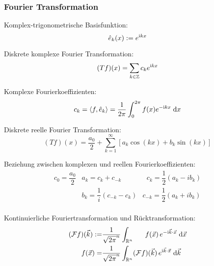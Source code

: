 \documentclass[11pt]{article}
\numberwithin{equation}{section}
\begin{document}
			\subsubsection{Fourier Transformation}
				\noindent
				Komplex-trigonometrische Basisfunktion:
				\begin{equation}
					\hat{e}_k(x):=e^{\mathrm{i} kx}
				\end{equation}

				\noindent
				Diskrete komplexe Fourier Transformation:
				\begin{equation}
					(Tf)(x)=\sum_{k\in\mathbb{Z}}c_k e^{\mathrm{i} kx}
				\end{equation}

				\noindent
				Komplexe Fourierkoeffizienten:
				\begin{equation}
					c_k = \left<f,\hat{e}_k\right>=\frac{1}{2\pi}\int_0^{2\pi}f(x)e^{-\mathrm{i} kx}\;\mathrm{d} x
				\end{equation}

				\noindent
				Diskrete reelle Fourier Transformation:
				\begin{equation}
					(Tf)(x)=\frac{a_0}{2}+\sum_{k=1}^{\infty}\left[a_k \cos(kx) + b_k \sin(kx) \right]
				\end{equation}

				\noindent
				Beziehung zwischen komplexen und reellen Fourierkoeffizienten:
				\begin{equation}
					\begin{array}{clc}
						c_0 = \dfrac{a_0}{2} & a_k = c_k+c_{-k} & \phantom{_{-}}c_k = \dfrac{1}{2}\left(a_k-ib_k\right) \\ [6pt]
						& b_k = \dfrac{1}{i}\left(c_{-k}-c_{k}\right) & c_{-k} = \dfrac{1}{2}\left(a_k+ib_k\right) \\
					\end{array}
				\end{equation}

				\noindent
				Kontinuierliche Fouriertransformation und Rücktransformation:
				\begin{equation}
					\begin{aligned}
						(\mathcal{F}f)(\vec{k}) :=& \frac{1}{\sqrt{2\pi}^n}\int_{\mathbb{R}^n} \phantom{(\mathcal{F})}f(\vec{x})\, e^{-\i\vec{k}\cdot\vec{x}}\;\diff\vec{x} \\
						\phantom{(\mathcal{F})}f(\vec{x}) =& \frac{1}{\sqrt{2\pi}^n}\int_{\mathbb{R}^n} (\mathcal{F}f)(\vec{k}) \,e^{\i\vec{k}\cdot\vec{x}}\;\diff \vec{k} \\
					\end{aligned}
				\end{equation}
\end{document}
